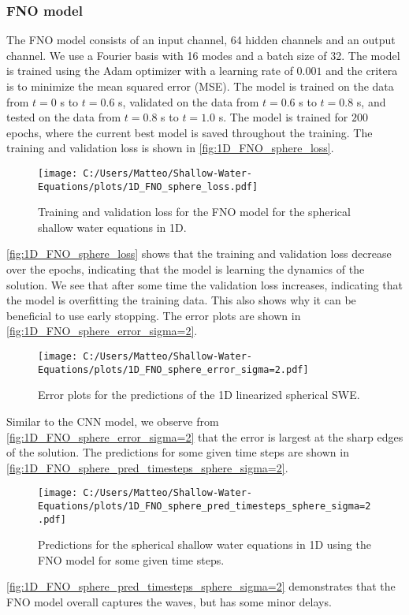 \subsubsection*{FNO model}
The FNO model consists of an input channel, 64 hidden channels and an output channel. We use a Fourier basis with 16 modes and a batch size of 32.
The model is trained using the Adam optimizer with a learning rate of $0.001$ and the critera is to minimize the mean squared error (MSE).
The model is trained on the data from $t = 0$ s to $t = 0.6$ s, validated on the data from $t = 0.6$ s to $t = 0.8$ s, and tested on the data from $t = 0.8$ s to $t = 1.0$ s.
The model is trained for $200$ epochs, where the current best model is saved throughout the training.
The training and validation loss is shown in \autoref{fig:1D_FNO_sphere_loss}.
\begin{figure}[H]
    \centering
    \texttt{[image: C:/Users/Matteo/Shallow-Water-Equations/plots/1D\_FNO\_sphere\_loss.pdf]}
    \caption{Training and validation loss for the FNO model for the spherical shallow water equations in 1D.}\label{fig:1D_FNO_sphere_loss}
\end{figure}
\autoref{fig:1D_FNO_sphere_loss} shows that the training and validation loss decrease over the epochs, indicating that the model is learning the dynamics of the solution.
We see that after some time the validation loss increases, indicating that the model is overfitting the training data.
This also shows why it can be beneficial to use early stopping.
The error plots are shown in \autoref{fig:1D_FNO_sphere_error_sigma=2}.
\begin{figure}[H]
    \centering
    \texttt{[image: C:/Users/Matteo/Shallow-Water-Equations/plots/1D\_FNO\_sphere\_error\_sigma=2.pdf]}
    \caption{Error plots for the predictions of the 1D linearized spherical SWE.}\label{fig:1D_FNO_sphere_error_sigma=2}
\end{figure}
Similar to the CNN model, we observe from \autoref{fig:1D_FNO_sphere_error_sigma=2} that the error is largest at the sharp edges of the solution.
The predictions for some given time steps are shown in \autoref{fig:1D_FNO_sphere_pred_timesteps_sphere_sigma=2}.
\begin{figure}[H]
    \centering
    \texttt{[image: C:/Users/Matteo/Shallow-Water-Equations/plots/1D\_FNO\_sphere\_pred\_timesteps\_sphere\_sigma=2.pdf]}
    \caption{Predictions for the spherical shallow water equations in 1D using the FNO model for some given time steps.}\label{fig:1D_FNO_sphere_pred_timesteps_sphere_sigma=2}
\end{figure}
\autoref{fig:1D_FNO_sphere_pred_timesteps_sphere_sigma=2} demonstrates that the FNO model overall captures the waves, but has some minor delays.

